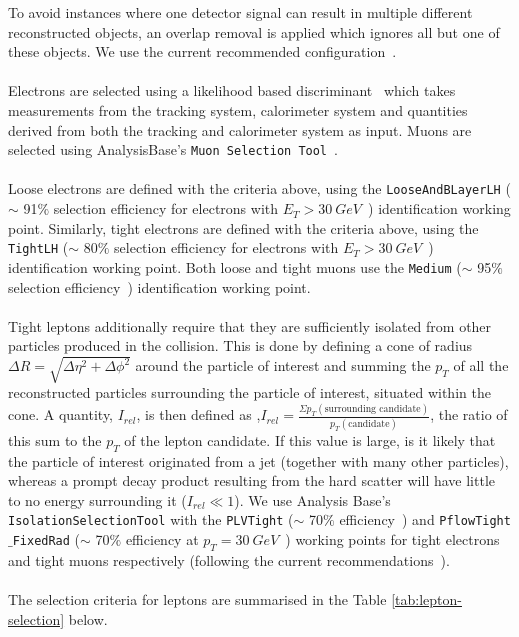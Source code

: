 To avoid instances where one detector signal can result in multiple different reconstructed objects, an overlap removal is applied which ignores all but one of these objects. We use the current recommended configuration~\cite{Overlap-removal-slides}.\\\\

Electrons are selected using a likelihood based discriminant~\cite{electronRecoAndID:paper} which takes measurements from the tracking system, calorimeter system and quantities derived from both the tracking and calorimeter system as input. Muons are selected using AnalysisBase's \texttt{Muon Selection Tool}~\cite{muon-selection-tool}.\\\\

Loose electrons are defined with the criteria above, using the \texttt{LooseAndBLayerLH} ($\sim$ 91$\%$ selection efficiency for electrons with $E_{T} > \SI{30}{GeV}$~\cite{electronIDefficiency}) identification working point. Similarly, tight electrons are defined with the criteria above, using the \texttt{TightLH} ($\sim$ 80$\%$ selection efficiency for electrons with $E_{T} > \SI{30}{GeV}$~\cite{electronIDefficiency}) identification working point. Both loose and tight muons use the \texttt{Medium} ($\sim$ 95$\%$ selection efficiency~\cite{muonIDEfficiency}) identification working point.\\\\

Tight leptons additionally require that they are sufficiently isolated from other particles produced in the collision. This is done by defining a cone of radius $\Delta R = \sqrt{\Delta \eta^{2} + \Delta \phi^{2}}$ around the particle of interest and summing the $p_{T}$ of all the reconstructed particles surrounding the particle of interest, situated within the cone. A quantity, $I_{rel}$, is then defined as ,$I_{rel} = \frac{\Sigma p_{T}(\text{surrounding candidate})  }{p_{T}(\text{candidate})}$, the ratio of this sum to the $p_{T}$ of the lepton candidate. If this value is large, is it likely that the particle of interest originated from a jet (together with many other particles), whereas a prompt decay product resulting from the hard scatter will have little to no energy surrounding it ($I_{rel} \ll 1$). We use Analysis Base's \texttt{IsolationSelectionTool} with the \texttt{PLVTight} ($\sim$ 70$\%$ efficiency~\cite{elecIsolationEfficiency})  and \texttt{PflowTight$\_$FixedRad} ($\sim$ 70$\%$ efficiency at $p_{T} = \SI{30}{GeV}$~\cite{muonIsolationEfficiency}) working points for tight electrons and tight muons respectively (following the current recommendations~\cite{recommendedIsolationWPs}).\\\\
The selection criteria for leptons are summarised in the Table \ref{tab:lepton-selection} below. 


